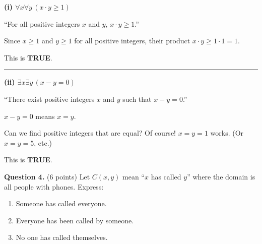 \documentclass[11pt,a4paper]{article}
\begin{document}
\begin{solnbox}
\textbf{(i) $\forall x \forall y\, (x \cdot y \geq 1)$}

``For all positive integers $x$ and $y$, $x \cdot y \geq 1$.''

Since $x \geq 1$ and $y \geq 1$ for all positive integers, their product $x \cdot y \geq 1 \cdot 1 = 1$.

This is \textbf{TRUE}.

\rule{\linewidth}{0.3pt}

\textbf{(ii) $\exists x \exists y\, (x - y = 0)$}

``There exist positive integers $x$ and $y$ such that $x - y = 0$.''

$x - y = 0$ means $x = y$.

Can we find positive integers that are equal? Of course! $x = y = 1$ works. (Or $x = y = 5$, etc.)

This is \textbf{TRUE}.
\end{solnbox}

\vspace{15pt}

\textbf{Question 4.} (6 points) Let $C(x, y)$ mean ``$x$ has called $y$'' where the domain is all people with phones. Express:

\begin{enumerate}[label=(\roman*)]
    \item Someone has called everyone.
    \item Everyone has been called by someone.
    \item No one has called themselves.
\end{enumerate}
\end{document}
